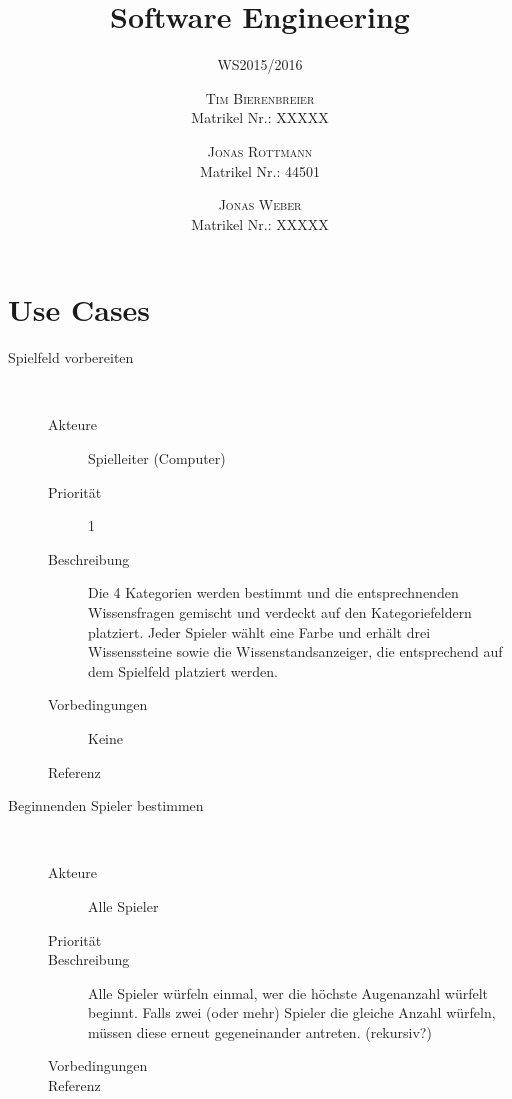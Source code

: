 \documentclass{scrartcl} %
\title{Software Engineering}
\subtitle{WS2015/2016} %
\author{
	\textsc{Tim Bierenbreier}\\
	\normalsize Matrikel Nr.: XXXXX
	\and
	\textsc{Jonas Rottmann}\\
	\normalsize Matrikel Nr.: 44501
	\and
	\textsc{Jonas Weber}\\
	\normalsize Matrikel Nr.: XXXXX
}
\begin{document}
\maketitle
\section{Use Cases}

\begin{description}
   \item[Spielfeld vorbereiten]~\par
   \begin{description}
      \item[Akteure] Spielleiter (Computer)
      \item[Priorität]  1
      \item[Beschreibung] Die 4 Kategorien werden bestimmt und die entsprechnenden Wissensfragen gemischt und verdeckt auf den Kategoriefeldern platziert. Jeder Spieler wählt eine Farbe und erhält drei Wissenssteine sowie die Wissenstandsanzeiger, die entsprechend auf dem Spielfeld platziert werden.
      \item[Vorbedingungen] Keine
      \item[Referenz] 
   \end{description}
\end{description}
\begin{description}
   \item[Beginnenden Spieler bestimmen]~\par
   \begin{description}
      \item[Akteure] Alle Spieler
      \item[Priorität]  
      \item[Beschreibung] Alle Spieler würfeln einmal, wer die höchste Augenanzahl würfelt beginnt. Falls zwei (oder mehr) Spieler die gleiche Anzahl würfeln, müssen diese erneut gegeneinander antreten. (rekursiv?)
      \item[Vorbedingungen] 
      \item[Referenz] 
   \end{description}
\end{description}
\end{document}
